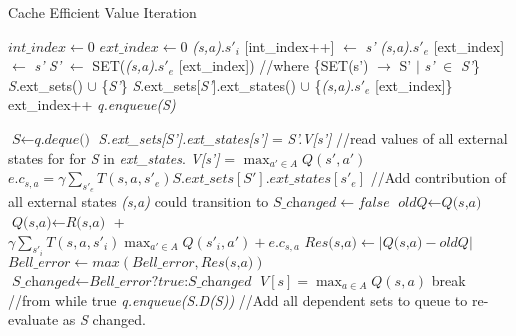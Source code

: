 \documentclass[conference]{IEEEtran}
\begin{document}
\begin{algorithm}
\caption{Cache Efficient Value Iteration}
\label{alg:CaV}
\begin{algorithmic}[1]
	\label{alg:CaV:setupStart}
		\State $int\_index \leftarrow 0 $
		\State $ext\_index \leftarrow 0$
				\State \textit{(s,a)}.\textit{$s'_{i}$} [int\_index++] $\leftarrow$ \textit{s'}
				\State \textit{(s,a)}.\textit{$s'_{e}$} [ext\_index] $\leftarrow$ \textit{s'}
				\State \textit{S'} $\leftarrow$ SET(\textit{(s,a)}.\textit{$s'_{e}$} [ext\_index])  {\tiny //where \{SET(s') $\rightarrow$ S' $\mid$ \textit{s'} $\in$ \textit{S'}\}}
				\State \textit{S}.ext\_sets() $\cup$ \{\textit{S'}\}
				\State \textit{S}.ext\_sets[\textit{S'}].ext\_states() \textbf{$\cup$} \{\textit{(s,a)}.\textit{$s'_{e}$} [ext\_index]\}
				\State ext\_index++
			\EndIf
		\EndFor
	\EndFor
\State \textit{q.enqueue(S)}
\EndFor	\label{alg:CaV:setupEnd}

	\label{alg:CaV:cachedAlg}
	\State $\textit{S} \leftarrow \textit{q.deque()}$
		\State \textit{S.ext\_sets[S'].ext\_states[s']} = \textit{S'.V[s']}  {\tiny //read values of all external states for for \textit{S} in \textit{ext\_states}. \textit{V[s']} = ${\displaystyle\max_{a'\in A}Q(s',a')}$}
		\label{alg:CaV:extStates}
	\EndFor
		\State $e.c_{s,a} = \gamma \sum\limits_{s'_{e}} T(s,a,s'_{e}) S.ext\_sets[S'].ext\_states[s'_{e}]$ {\tiny //Add contribution of all external states \textit{(s,a)} could transition to}
	\EndFor
	\State $\textit{S\_changed} \leftarrow false$
			\State $\textit{oldQ} \leftarrow \textit{Q(s,a)}$
			\State $\textit{Q(s,a)} \leftarrow \textit{R(s,a)}$ + \\
			$\gamma \sum\limits_{s'_{i}} T(s,a,s'_{i})  {\displaystyle\max_{a'\in A} } Q(s'_{i},a') + e.c_{s,a}$
			\label{alg:CaV:finalEqn}
			\State $\textit{Res(s,a)} \leftarrow |\textit{Q(s,a)} - \textit{oldQ}|$
			\State $\textit{Bell\_error} \leftarrow max(\textit{Bell\_error} , \textit{Res(s,a)})$
			\State  $\textit{S\_changed} \leftarrow \textit{Bell\_error?true:S\_changed}$
			\State $V[s] = {\displaystyle\max_{a\in A}Q(s,a)}$
		\EndFor
			\State break {\tiny //from while true}
		\EndIf
	\EndWhile
		\State \textit{q.enqueue(S.D(S))}  {\tiny //Add all dependent sets to queue to re-evaluate as \textit{S} changed.}
	\EndIf
{}	\label{alg:CaV:cachedAlgEnd}
\end{algorithmic}
\end{algorithm}
\end{document}
